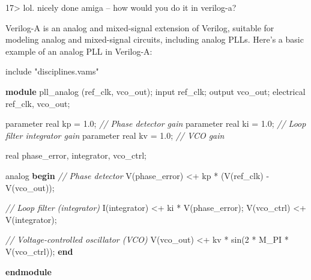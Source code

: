 \documentclass[
]{article}
\newenvironment{Shaded}{}{}
\newcommand{\CommentTok}[1]{\textcolor[rgb]{0.38,0.63,0.69}{\textit{#1}}}
\newcommand{\DataTypeTok}[1]{\textcolor[rgb]{0.56,0.13,0.00}{#1}}
\newcommand{\DecValTok}[1]{\textcolor[rgb]{0.25,0.63,0.44}{#1}}
\newcommand{\FloatTok}[1]{\textcolor[rgb]{0.25,0.63,0.44}{#1}}
\newcommand{\KeywordTok}[1]{\textcolor[rgb]{0.00,0.44,0.13}{\textbf{#1}}}
\newcommand{\NormalTok}[1]{#1}
\newcommand{\OperatorTok}[1]{\textcolor[rgb]{0.40,0.40,0.40}{#1}}
\newcommand{\OtherTok}[1]{\textcolor[rgb]{0.00,0.44,0.13}{#1}}
\begin{document}
17\textgreater{} lol. nicely done amiga -- how would you do it in
verilog-a?

Verilog-A is an analog and mixed-signal extension of Verilog, suitable
for modeling analog and mixed-signal circuits, including analog PLLs.
Here's a basic example of an analog PLL in Verilog-A:

\begin{Shaded}
\begin{Highlighting}[]
\OtherTok{\textasciigrave{}include }\FloatTok{"disciplines.vams"}

\KeywordTok{module}\NormalTok{ pll\_analog }\OperatorTok{(}\NormalTok{ref\_clk}\OperatorTok{,}\NormalTok{ vco\_out}\OperatorTok{);}
  \DataTypeTok{input}\NormalTok{ ref\_clk}\OperatorTok{;}
  \DataTypeTok{output}\NormalTok{ vco\_out}\OperatorTok{;}
\NormalTok{  electrical ref\_clk}\OperatorTok{,}\NormalTok{ vco\_out}\OperatorTok{;}

  \DataTypeTok{parameter} \DataTypeTok{real}\NormalTok{ kp }\OperatorTok{=} \FloatTok{1.0}\OperatorTok{;} \CommentTok{// Phase detector gain}
  \DataTypeTok{parameter} \DataTypeTok{real}\NormalTok{ ki }\OperatorTok{=} \FloatTok{1.0}\OperatorTok{;} \CommentTok{// Loop filter integrator gain}
  \DataTypeTok{parameter} \DataTypeTok{real}\NormalTok{ kv }\OperatorTok{=} \FloatTok{1.0}\OperatorTok{;} \CommentTok{// VCO gain}

  \DataTypeTok{real}\NormalTok{ phase\_error}\OperatorTok{,}\NormalTok{ integrator}\OperatorTok{,}\NormalTok{ vco\_ctrl}\OperatorTok{;}

\NormalTok{  analog }\KeywordTok{begin}
    \CommentTok{// Phase detector}
\NormalTok{    V}\OperatorTok{(}\NormalTok{phase\_error}\OperatorTok{)} \OperatorTok{\textless{}+}\NormalTok{ kp * }\OperatorTok{(}\NormalTok{V}\OperatorTok{(}\NormalTok{ref\_clk}\OperatorTok{)} \OperatorTok{{-}}\NormalTok{ V}\OperatorTok{(}\NormalTok{vco\_out}\OperatorTok{));}

    \CommentTok{// Loop filter (integrator)}
\NormalTok{    I}\OperatorTok{(}\NormalTok{integrator}\OperatorTok{)} \OperatorTok{\textless{}+}\NormalTok{ ki * V}\OperatorTok{(}\NormalTok{phase\_error}\OperatorTok{);}
\NormalTok{    V}\OperatorTok{(}\NormalTok{vco\_ctrl}\OperatorTok{)} \OperatorTok{\textless{}+}\NormalTok{ V}\OperatorTok{(}\NormalTok{integrator}\OperatorTok{);}

    \CommentTok{// Voltage{-}controlled oscillator (VCO)}
\NormalTok{    V}\OperatorTok{(}\NormalTok{vco\_out}\OperatorTok{)} \OperatorTok{\textless{}+}\NormalTok{ kv * sin}\OperatorTok{(}\DecValTok{2}\NormalTok{ * }\OtherTok{\textasciigrave{}M\_PI}\NormalTok{ * V}\OperatorTok{(}\NormalTok{vco\_ctrl}\OperatorTok{));}
  \KeywordTok{end}

\KeywordTok{endmodule}
\end{Highlighting}
\end{Shaded}
\end{document}
